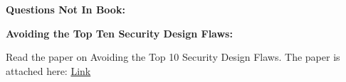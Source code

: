 \documentclass[12pt]{article}
\begin{document}
\renewcommand{\headrulewidth}{0.4pt}
\vspace{-3mm}

\hspace{-2em}
{\Large \textbf{Questions Not In Book:}} \par \vspace{0.5em}

\noindent \textbf{Avoiding the Top Ten Security Design Flaws:} \par

\noindent Read the paper on Avoiding the Top 10 Security Design Flaws. The paper is attached here: {\color{blue} \href{/courses/17040/files/1536065/download?verifier=UXwHmw0dzZz9wZfKfTD1sor0taZjyu5GQHjikY8R&wrap=1}{Link}}\\
\end{document}
